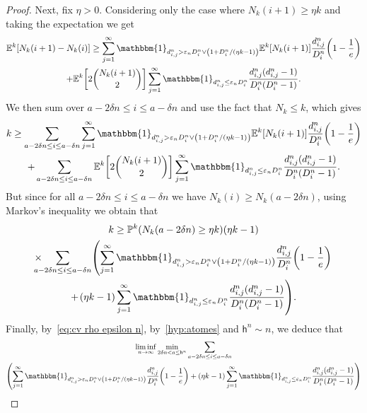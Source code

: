 \documentclass[10pt]{amsart}
\theoremstyle{definition}\newtheorem{defi}[theo]{Definition}\newtheorem{rema}[theo]{Remark}\newtheorem{exam}[theo]{Example}\newtheorem{exem}[theo]{Example}\newtheorem{nota}[theo]{Notation}
\newcommand{\e}{\varepsilon}
\renewcommand{\P}{{\mathbb{P}}}
\newcommand{\E}{\mathbb{E}}
\newcommand{\1}{\mathbbm{1}}
\newcommand{\h}{\mathsf{h}}
\let\originalleft\left
\let\originalright\right
\renewcommand{\left}{\mathopen{}\mathclose\bgroup\originalleft}
\renewcommand{\right}{\aftergroup\egroup\originalright}
\renewcommand*{\to}{\mathchoice{\longrightarrow}{\rightarrow}{\rightarrow}{\rightarrow}}
\begin{document}
\begin{proof}
Next, fix $\eta>0$. Considering only the case where $N_k(i+1)\ge \eta k$ and taking the expectation we get
\begin{multline*}
\E^k \left[N_k(i+1) - N_k(i) \right]
\ge \sum_{j=1}^\infty \1_{d^n_{i,j}>\e_n D^n_i \vee \left(1+ D^n_i/(\eta k-1)\right)} \E^k[N_k(i+1)] \frac{d^n_{i,j}}{D^n_i} \left(1-\frac{1}{e}\right)
\\+ \E^k\left[2\binom{N_k(i+1)}{2}\right] \sum_{j=1}^\infty \1_{d^n_{i,j} \le \e_n D^n_i} \frac{d^n_{i,j} (d^n_{i,j} -1)}{D^n_i(D^n_i-1)}.
\end{multline*}
We then sum over $a-2\delta n \le i \le a - \delta n$ and use the fact that $N_k \le k$, which gives
\begin{multline*}
k\ge \sum_{a-2 \delta n \le i \le a-\delta n}\sum_{j=1}^\infty \1_{d^n_{i,j}>\e_n D^n_i \vee \left(1+ D^n_i/(\eta k-1)\right)} \E^k[N_k(i+1)] \frac{d^n_{i,j}}{D^n_i} \left(1-\frac{1}{e}\right) \\
+ \sum_{a-2 \delta n \le i \le a-\delta n}\E^k\left[2\binom{N_k(i+1)}{2}\right] \sum_{j=1}^\infty \1_{d^n_{i,j} \le \e_n D^n_i} \frac{d^n_{i,j} (d^n_{i,j} -1)}{D^n_i(D^n_i-1)}.
\end{multline*}
But since for all $a-2 \delta n \le i \le a- \delta n$ we have $N_k(i) \ge N_k(a-2\delta n)$, using Markov's inequality we obtain that
\begin{multline}\label{eq majoration nombre de gens qui ne coalescent pas}
k\ge \P^k(N_k(a- 2 \delta n)\ge \eta k) (\eta k-1)\\
\times\!\!\!\!\!\!\sum_{a-2 \delta n \le i \le a-\delta n} \left(\sum_{j=1}^\infty \1_{d^n_{i,j}>\e_n D^n_i \vee \left(1+ D^n_i/(\eta k-1)\right)} \frac{d^n_{i,j}}{D^n_i} \left(1-\frac{1}{e}\right)\right.\\
 +\left. (\eta k-1)\sum_{j=1}^\infty \1_{d^n_{i,j} \le \e_n D^n_i} \frac{d^n_{i,j} (d^n_{i,j} -1)}{D^n_i(D^n_i-1)} \right).
\end{multline}
Finally, by~\eqref{eq:cv rho epsilon n}, by~\ref{hyp:atomes} and $\h^n\sim n$, we deduce that
\begin{multline*}
\liminf_{n\to \infty} \min_{2 \delta n < a \le \h^n}
\sum_{a-2 \delta n \le i \le a-\delta n}\\
\left(\sum_{j=1}^\infty \1_{d^n_{i,j}>\e_n D^n_i \vee \left(1+ D^n_i/(\eta k-1)\right)} \frac{d^n_{i,j}}{D^n_i} \left(1-\frac{1}{e}\right)
+ (\eta k-1)\sum_{j=1}^\infty \1_{d^n_{i,j} \le \e_n D^n_i} \frac{d^n_{i,j} (d^n_{i,j} -1)}{D^n_i(D^n_i-1)} \right)\\

\end{multline*}
\end{proof}
\end{document}

